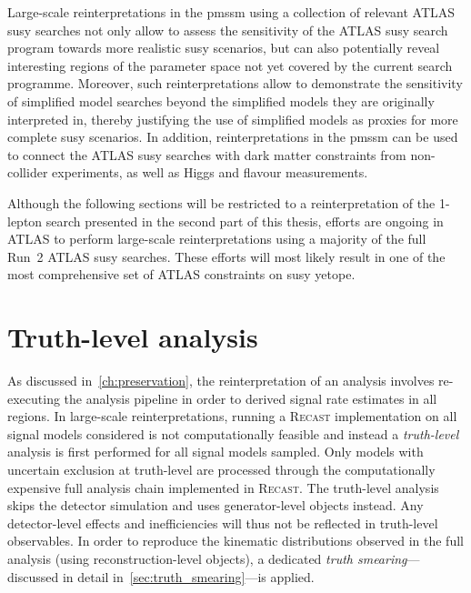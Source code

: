 Large-scale reinterpretations in the \gls{pmssm} using a collection of relevant ATLAS \gls{susy} searches not only allow to assess the sensitivity of the ATLAS \gls{susy} search program towards more realistic \gls{susy} scenarios, but can also potentially reveal interesting regions of the parameter space not yet covered by the current search programme. Moreover, such reinterpretations allow to demonstrate the sensitivity of simplified model searches beyond the simplified models they are originally interpreted in, thereby justifying the use of simplified models as proxies for more complete \gls{susy} scenarios. In addition, reinterpretations in the \gls{pmssm} can be used to connect the ATLAS \gls{susy} searches with dark matter constraints from non-collider experiments, as well as Higgs and flavour measurements.  

Although the following sections will be restricted to a reinterpretation of the 1-lepton search presented in the second part of this thesis, efforts are ongoing in ATLAS to perform large-scale reinterpretations using a majority of the full Run~2 ATLAS \gls{susy} searches. These efforts will most likely result in one of the most comprehensive set of ATLAS constraints on \gls{susy} yetope.

\section{Truth-level analysis}\label{sec:truth_analysis}

As discussed in~\cref{ch:preservation}, the reinterpretation of an analysis involves re-executing the analysis pipeline in order to derived signal rate estimates in all regions. In large-scale reinterpretations, running a \textsc{Recast} implementation on all signal models considered is not computationally feasible and instead a \textit{truth-level} analysis is first performed for all signal models sampled. Only models with uncertain exclusion at truth-level are processed through the computationally expensive full analysis chain implemented in \textsc{Recast}. The truth-level analysis skips the detector simulation and uses generator-level objects instead. Any detector-level effects and inefficiencies will thus not be reflected in truth-level observables. In order to reproduce the kinematic distributions observed in the full analysis (using reconstruction-level objects), a dedicated \textit{truth smearing}---discussed in detail in~\cref{sec:truth_smearing}---is applied.

